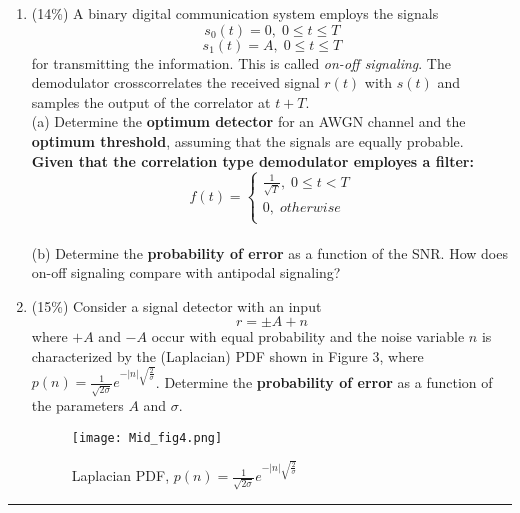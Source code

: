 \documentclass[a4paper,12pt]{article}
\begin{document}
\begin{enumerate}
        \item(14\%) 
            A binary digital communication system employs the signals \\ 
            $$s_0(t) = 0, \; 0 \leq t \leq T$$
            $$s_1(t) = A, \; 0 \leq t \leq T$$
            for transmitting the information. This is called \emph{on-off signaling}. The demodulator crosscorrelates the received signal $r(t)$ with $s(t)$ and samples the output of the correlator at $t + T$. \\
            (a) Determine the \textbf{optimum detector} for an AWGN channel and the \textbf{optimum threshold}, assuming that the signals are equally probable. \\ 
            \textbf{Given that the correlation type demodulator employes a filter:} \\ 
            $$f(t) = \left\{ 
            \begin{aligned}
                \frac{1}{\sqrt{T}}, \; 0 \leq t < T \\
                 0, \; otherwise \\ 
            \end{aligned}
            \right.
            $$ \\
            (b) Determine the \textbf{probability of error} as a function of the SNR. How does on-off signaling compare with antipodal signaling? \\
        \item(15\%) 
            Consider a signal detector with an input $$r = \pm A + n$$ where $+A$ and $-A$ occur with equal probability and the noise variable $n$ is characterized by the (Laplacian) PDF shown in Figure 3, where $p(n) = \frac{1}{\sqrt{2\sigma}}e^{-|n|\sqrt{\frac{2}{\sigma}}}$.
            Determine the \textbf{probability of error} as a function of the parameters $A$ and $\sigma$. \\
            \begin{figure}[h]
            	\centering
            	\texttt{[image: Mid\_fig4.png]}
            	\caption{Laplacian PDF, $p(n) = \frac{1}{\sqrt{2\sigma}}e^{-|n|\sqrt{\frac{2}{\sigma}}}$}
            \end{figure}
    \end{enumerate}
    \rule{\textwidth}{0.4pt}
\end{document}
